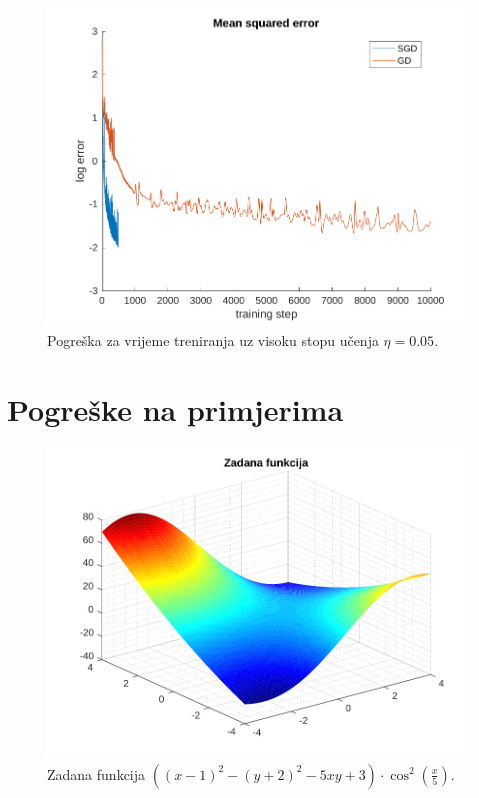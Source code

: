 \documentclass[12pt, a4paper]{article}
\begin{document}
\begin{figure}[H]
  \centering
  \includegraphics[width=\linewidth]{graf_visoka.pdf}
  \caption{Pogreška za vrijeme treniranja uz visoku stopu učenja $\eta=0.05$.}
\end{figure}

\section*{Pogreške na primjerima}

\begin{figure}[H]
  \centering
  \includegraphics[width=\linewidth]{zadana.pdf}
  \caption{Zadana funkcija $\left( \left( x - 1 \right)^2 - \left(y + 2\right)^2 - 5 x y + 3 \right) \cdot \cos^2\left( \frac{x}{5} \right)$.}
\end{figure}
\end{document}
